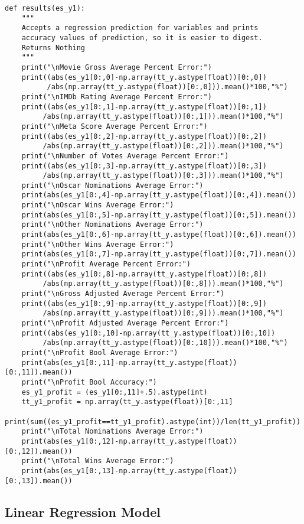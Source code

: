 \documentclass{article}
\begin{document}
\begin{lstlisting}
def results(es_y1):
	"""
	Accepts a regression prediction for variables and prints 
	accuracy values of prediction, so it is easier to digest.
	Returns Nothing
	"""
	print("\nMovie Gross Average Percent Error:")
	print((abs(es_y1[0:,0]-np.array(tt_y.astype(float))[0:,0])
	      /abs(np.array(tt_y.astype(float))[0:,0])).mean()*100,"%")
	print("\nIMDb Rating Average Percent Error:")
	print((abs(es_y1[0:,1]-np.array(tt_y.astype(float))[0:,1])
	     /abs(np.array(tt_y.astype(float))[0:,1])).mean()*100,"%")
	print("\nMeta Score Average Percent Error:")
	print((abs(es_y1[0:,2]-np.array(tt_y.astype(float))[0:,2])
	     /abs(np.array(tt_y.astype(float))[0:,2])).mean()*100,"%")
	print("\nNumber of Votes Average Percent Error:")
	print((abs(es_y1[0:,3]-np.array(tt_y.astype(float))[0:,3])
	     /abs(np.array(tt_y.astype(float))[0:,3])).mean()*100,"%")
	print("\nOscar Nominations Average Error:")
	print(abs(es_y1[0:,4]-np.array(tt_y.astype(float))[0:,4]).mean())
	print("\nOscar Wins Average Error:")
	print(abs(es_y1[0:,5]-np.array(tt_y.astype(float))[0:,5]).mean())
	print("\nOther Nominations Average Error:")
	print(abs(es_y1[0:,6]-np.array(tt_y.astype(float))[0:,6]).mean())
	print("\nOther Wins Average Error:")
	print(abs(es_y1[0:,7]-np.array(tt_y.astype(float))[0:,7]).mean())
	print("\nProfit Average Percent Error:")
	print((abs(es_y1[0:,8]-np.array(tt_y.astype(float))[0:,8])
	     /abs(np.array(tt_y.astype(float))[0:,8])).mean()*100,"%")
	print("\nGross Adjusted Average Percent Error:")
	print((abs(es_y1[0:,9]-np.array(tt_y.astype(float))[0:,9])
	     /abs(np.array(tt_y.astype(float))[0:,9])).mean()*100,"%")
	print("\nProfit Adjusted Average Percent Error:")
	print((abs(es_y1[0:,10]-np.array(tt_y.astype(float))[0:,10])
	     /abs(np.array(tt_y.astype(float))[0:,10])).mean()*100,"%")
	print("\nProfit Bool Average Error:")
	print(abs(es_y1[0:,11]-np.array(tt_y.astype(float))[0:,11]).mean())
	print("\nProfit Bool Accuracy:")
	es_y1_profit = (es_y1[0:,11]+.5).astype(int)
	tt_y1_profit = np.array(tt_y.astype(float))[0:,11]
	print(sum((es_y1_profit==tt_y1_profit).astype(int))/len(tt_y1_profit))
	print("\nTotal Nominations Average Error:")
	print(abs(es_y1[0:,12]-np.array(tt_y.astype(float))[0:,12]).mean())
	print("\nTotal Wins Average Error:")
	print(abs(es_y1[0:,13]-np.array(tt_y.astype(float))[0:,13]).mean())

\end{lstlisting}

\hypertarget{linear-regression-model}{%
	\subsection{Linear Regression Model}\label{linear-regression-model}}
\end{document}
